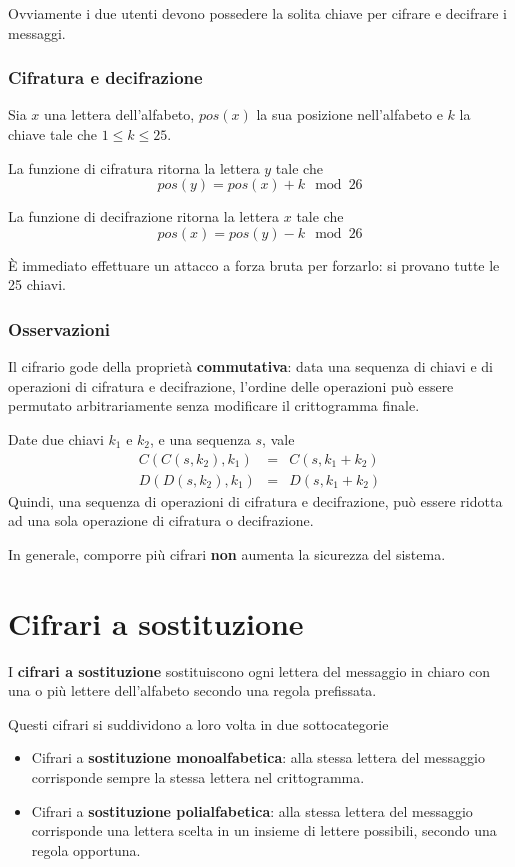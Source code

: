 Ovviamente i due utenti devono possedere la solita chiave per cifrare e decifrare i messaggi.

\subsubsection{Cifratura e decifrazione}
Sia $x$ una lettera dell'alfabeto, $pos(x)$ la sua posizione nell'alfabeto e $k$ la chiave tale che $1 \leq k \leq 25$.

La funzione di cifratura ritorna la lettera $y$ tale che
\[ pos(y) = pos(x) + k \mod{26} \]

La funzione di decifrazione ritorna la lettera $x$ tale che
\[ pos(x) = pos(y) - k \mod{26} \]

\`E immediato effettuare un attacco a forza bruta per forzarlo: si provano tutte le 25 chiavi.

\subsubsection{Osservazioni}
Il cifrario gode della propriet\`a \textbf{commutativa}: data una sequenza di chiavi e di operazioni di cifratura e
decifrazione, l'ordine delle operazioni pu\`o essere permutato arbitrariamente senza modificare il crittogramma finale.

Date due chiavi $k_1$ e $k_2$, e una sequenza $s$, vale
\[
	\begin{matrix}
		C(C(s, k_2), k_1) & = & C(s, k_1 + k_2) \\
		D(D(s, k_2), k_1) & = & D(s, k_1 + k_2)
	\end{matrix}
\]
Quindi, una sequenza di operazioni di cifratura e decifrazione, pu\`o essere ridotta ad una sola operazione di cifratura
o decifrazione.

In generale, comporre pi\`u cifrari \textbf{non} aumenta la sicurezza del sistema.

\section{Cifrari a sostituzione}\label{sostituzione}
I \textbf{cifrari a sostituzione} sostituiscono ogni lettera del messaggio in chiaro con una o pi\`u lettere
dell'alfabeto secondo una regola prefissata.

Questi cifrari si suddividono a loro volta in due sottocategorie
\begin{itemize}
	\item Cifrari a \textbf{sostituzione monoalfabetica}: alla stessa lettera del messaggio corrisponde sempre la
	      stessa lettera nel crittogramma.
	\item Cifrari a \textbf{sostituzione polialfabetica}: alla stessa lettera del messaggio corrisponde una lettera
	      scelta in un insieme di lettere possibili, secondo una regola opportuna.
\end{itemize}

